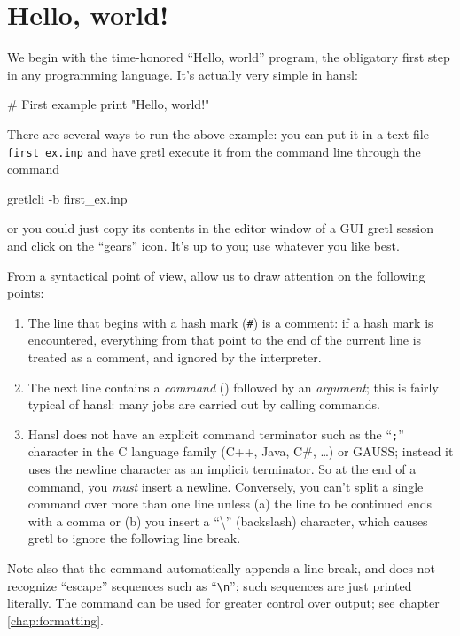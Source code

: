 \chapter{Hello, world!}
\label{chap:hello}

We begin with the time-honored ``Hello, world'' program, the
obligatory first step in any programming language. It's actually very
simple in hansl:
\begin{code}
  # First example
  print "Hello, world!"
\end{code}

There are several ways to run the above example: you can put it in a
text file \texttt{first\_ex.inp} and have gretl execute it from the
command line through the command
\begin{code}
  gretlcli -b first_ex.inp
\end{code}
or you could just copy its contents in the editor window of a GUI
gretl session and click on the ``gears'' icon. It's up to you; use
whatever you like best.

From a syntactical point of view, allow us to draw attention on
the following points:
\begin{enumerate}
\item The line that begins with a hash mark (\texttt{\#}) is a
  comment: if a hash mark is encountered, everything from that point
  to the end of the current line is treated as a comment, and ignored
  by the interpreter.
\item The next line contains a \emph{command} () followed
  by an \emph{argument}; this is fairly typical of hansl: many jobs
  are carried out by calling commands.
\item Hansl does not have an explicit command terminator such as the
  ``\texttt{;}'' character in the C language family (C++, Java, C\#,
  \ldots) or GAUSS; instead it uses the newline character as an
  implicit terminator. So at the end of a command, you \emph{must}
  insert a newline. Conversely, you can't split a single command
  over more than one line unless (a) the line to be continued ends
  with a comma or (b) you insert a ``\textbackslash'' (backslash)
  character, which causes gretl to ignore the following line break.
\end{enumerate}

Note also that the  command automatically appends a line
break, and does not recognize ``escape'' sequences such as
``\verb|\n|''; such sequences are just printed literally. The
 command can be used for greater control over output; see
chapter \ref{chap:formatting}.

